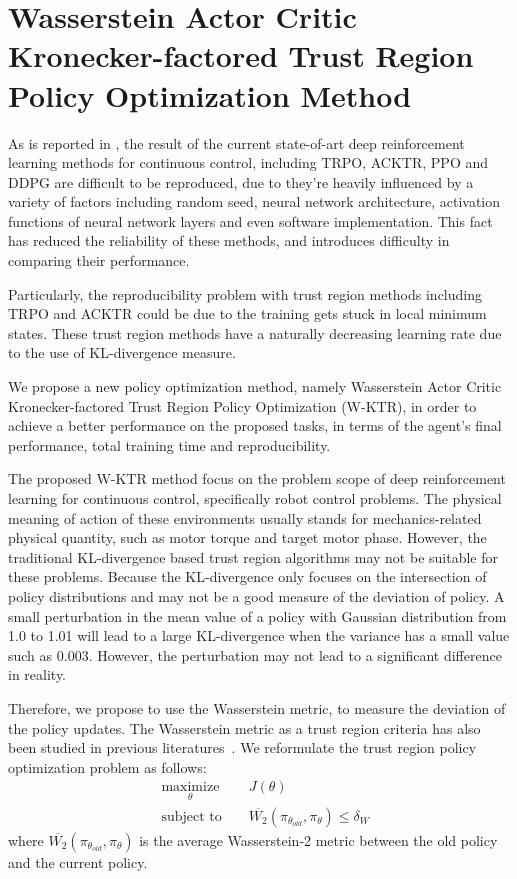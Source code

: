 \section{Wasserstein Actor Critic Kronecker-factored Trust Region Policy Optimization Method }
As is reported in \cite{henderson2017matters}, the result of the current state-of-art deep reinforcement learning methods for continuous control, including TRPO, ACKTR, PPO and DDPG are difficult to be reproduced, due to they're heavily influenced by a variety of factors including random seed, neural network architecture, activation functions of neural network layers and even software implementation. This fact has reduced the reliability of these methods, and introduces difficulty in comparing their performance.

Particularly, the reproducibility problem with trust region methods including TRPO and ACKTR could be due to the training gets stuck in local minimum states. These trust region methods have a naturally decreasing learning rate due to the use of KL-divergence measure. 

We propose a new policy optimization method, namely Wasserstein Actor Critic Kronecker-factored Trust Region Policy Optimization (W-KTR), in order to achieve a better performance on the proposed tasks, in terms of the agent's final performance, total training time and reproducibility.

The proposed W-KTR method focus on the problem scope of deep reinforcement learning for continuous control, specifically robot control problems. The physical meaning of action of these environments usually stands for mechanics-related physical quantity, such as motor torque and target motor phase. However, the traditional KL-divergence based trust region algorithms may not be suitable for these problems. Because the KL-divergence only focuses on the intersection of policy distributions and may not be a good measure of the deviation of policy. A small perturbation in the mean value of a policy with Gaussian distribution from 1.0 to 1.01 will lead to a large KL-divergence when the variance has a small value such as 0.003. However, the perturbation may not lead to a significant difference in reality.

Therefore, we propose to use the Wasserstein metric, to measure the deviation of the policy updates. The Wasserstein metric as a trust region criteria has also been studied in previous literatures~\cite{tolstikhin2017wasserstein}. We reformulate the trust region policy optimization problem as follows:
\begin{equation}
    \begin{aligned}
&    \underset{\theta}{\text{maximize}} 
&& J(\theta) \\
& \text{subject to } 
&& \overline{W_2}(\pi_{\theta_{old}},\pi_\theta) \leq \delta_{W}\end{aligned}
\end{equation}
where $ \overline{W_2}(\pi_{\theta_{old}},\pi_\theta)$ is the average Wasserstein-2 metric between the old policy and the current policy.

